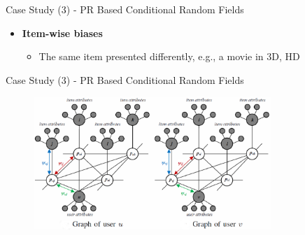 \documentclass[
 size=14pt,
 paper=smartboard,  %
 mode=present, 		%
 display=slides, 	%
 style=tuliplab,  	%
 pauseslide,
 fleqn,leqno]{powerdot}{}
\begin{document}
\begin{slide}[toc=,bm=]{Case Study (3) - PR Based Conditional Random Fields}
\begin{itemize}
\begin{itemize}
\begin{itemize}
			\end{itemize}
			
			\item \textbf{Item-wise biases}
			
			\begin{itemize}
				
				\item The same item presented differently,
				e.g., a movie in 3D, HD
				
			\end{itemize}
		\end{itemize}
	\end{itemize}

	
	
\end{slide}


\begin{slide}[toc=,bm=]{Case Study (3) - PR Based Conditional Random Fields}
	
	\begin{figure}[htbp]
		
		\includegraphics[width=0.8\textwidth]{figures//theme3//Theme3_5_3.eps}
		
	\end{figure}
	
	
	
\end{slide}

\end{document}
